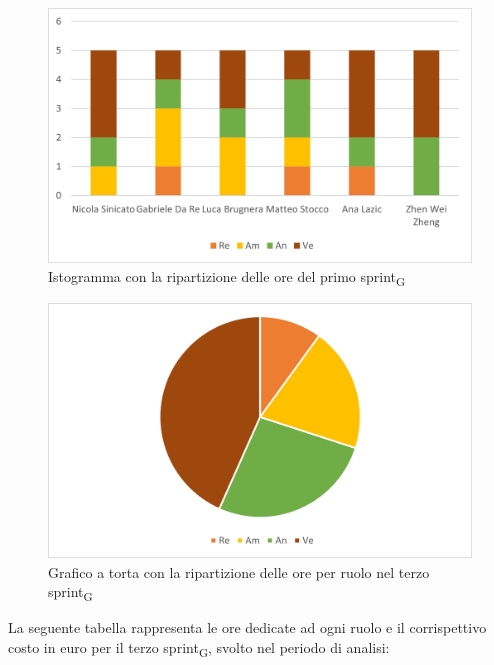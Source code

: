 \begin{figure}[H]
    \centering
    \includegraphics[scale=0.6]{img/grafi preventivo/istogrammi/analisi/sprint3.png}
    \caption{Istogramma con la ripartizione delle ore del primo sprint\textsubscript{G}}
\end{figure}
\begin{figure}[H]
    \centering
    \includegraphics[scale=0.6]{img/grafi preventivo/torta/analisi/sprint3.png}
    \caption{Grafico a torta con la ripartizione delle ore per ruolo nel terzo sprint\textsubscript{G}}
\end{figure}
La seguente tabella rappresenta le ore dedicate ad ogni ruolo e il corrispettivo costo in euro per il terzo sprint\textsubscript{G}, svolto nel periodo di analisi:

